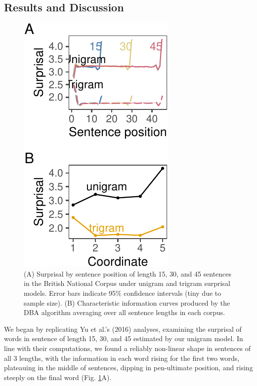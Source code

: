 \documentclass[10pt, letterpaper]{article}
\newenvironment{CodeChunk}{}{}
\begin{document}
\hypertarget{results-and-discussion}{%
\subsection{Results and Discussion}\label{results-and-discussion}}

\begin{CodeChunk}
\begin{figure}[tb]

{\centering \includegraphics{figs/bnc_plots-1} 

}

\caption[(A) Surprisal by sentence position of length 15, 30, and 45 sentences in the British National Corpus under unigram and trigram surprisal models]{(A) Surprisal by sentence position of length 15, 30, and 45 sentences in the British National Corpus under unigram and trigram surprisal models. Error bars indicate 95\% confidence intervals (tiny due to sample size). (B) Characteristic information curves produced by the DBA algorithm averaging over all sentence lengths in each corpus. }\label{fig:bnc_plots}
\end{figure}
\end{CodeChunk}

We began by replicating Yu et al.'s (2016) analyses, examining the
surprisal of words in sentence of length 15, 30, and 45 estimated by our
unigram model. In line with their computations, we found a reliably
non-linear shape in sentences of all 3 lengths, with the information in
each word rising for the first two words, plateauing in the middle of
sentences, dipping in pen-ultimate position, and rising steeply on the
final word (Fig. \ref{fig:bnc_plots}A).
\end{document}
